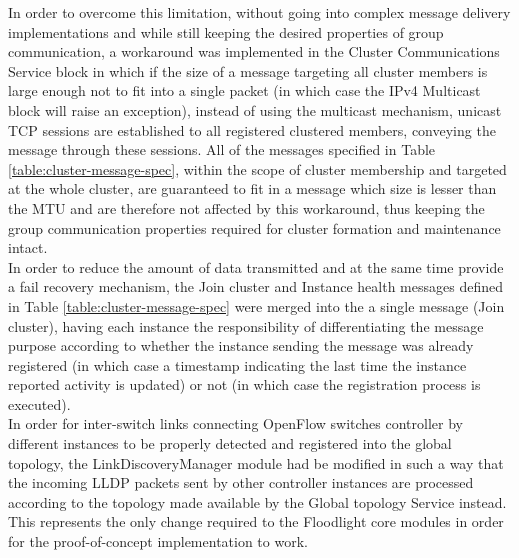 In order to overcome this limitation, without going into complex message delivery implementations and while still keeping the desired properties of group communication, a workaround was implemented in the Cluster Communications Service block in which if the size of a message targeting all cluster members is large enough not to fit into a single packet (in which case the IPv4 Multicast block will raise an exception), instead of using the multicast mechanism, unicast \gls{TCP} sessions are established to all registered clustered members, conveying the message through these sessions.
All of the messages specified in Table \ref{table:cluster-message-spec}, within the scope of cluster membership and targeted at the whole cluster, are guaranteed to fit in a message which size is lesser than the \gls{MTU} and are therefore not affected by this workaround, thus keeping the group communication properties required for cluster formation and maintenance intact.\\
In order to reduce the amount of data transmitted and at the same time provide a fail recovery mechanism, the Join cluster and Instance health messages defined in Table \ref{table:cluster-message-spec} were merged into the a single message (Join cluster), having each instance the responsibility of differentiating the message purpose according to whether the instance sending the message was already registered (in which case a timestamp indicating the last time the instance reported activity is updated) or not (in which case the registration process is executed).\\
%
In order for inter-switch links connecting OpenFlow switches controller by different instances to be properly detected and registered into the global topology, the LinkDiscoveryManager module had be modified in such a way that the incoming \gls{LLDP} packets sent by other controller instances are processed according to the topology made available by the Global topology Service instead.
This represents the only change required to the Floodlight core modules in order for the proof-of-concept implementation to work.
%
